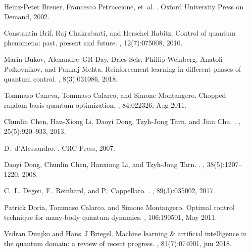 \documentclass[aps,pra,showkeys,showpacs,notitlepage,superscriptaddress]{revtex4-1}
\newcommand{\1}{{\rm 1\hspace{-0.9mm}l}}
\begin{document}
\begin{thebibliography}{10}
  Heinz-Peter Breuer, Francesco Petruccione, et~al.
  .
  \newblock Oxford University Press on Demand, 2002.
  
  Constantin Brif, Raj Chakrabarti, and Herschel Rabitz.
  \newblock Control of quantum phenomena: past, present and future.
  , 12(7):075008, 2010.
  
  Marin Bukov, Alexandre~GR Day, Dries Sels, Phillip Weinberg, Anatoli
  Polkovnikov, and Pankaj Mehta.
  \newblock Reinforcement learning in different phases of quantum control.
  , 8(3):031086, 2018.
  
  Tommaso Caneva, Tommaso Calarco, and Simone Montangero.
  \newblock Chopped random-basis quantum optimization.
  , 84:022326, Aug 2011.
  
  {Chunlin Chen}, {Han-Xiong Li}, {Daoyi Dong}, {Tzyh-Jong Tarn}, and {Jian Chu}.
  .
  ,
  25(5):920--933, 2013.
  
  D.~d'Alessandro.
  .
  \newblock CRC Press, 2007.
  
  {Daoyi Dong}, {Chunlin Chen}, {Hanxiong Li}, and {Tzyh-Jong Tarn}.
  .
  , 38(5):1207--1220, 2008.
  
  C.~L. Degen, F.~Reinhard, and P.~Cappellaro.
  .
  , 89(3):035002, 2017.
  
  Patrick Doria, Tommaso Calarco, and Simone Montangero.
  \newblock Optimal control technique for many-body quantum dynamics.
  , 106:190501, May 2011.
  
  Vedran Dunjko and Hans~J Briegel.
  \newblock Machine learning {\&} artificial intelligence in the quantum domain:
  a review of recent progress.
  , 81(7):074001, jun 2018.
  

\end{thebibliography}
\end{document}
